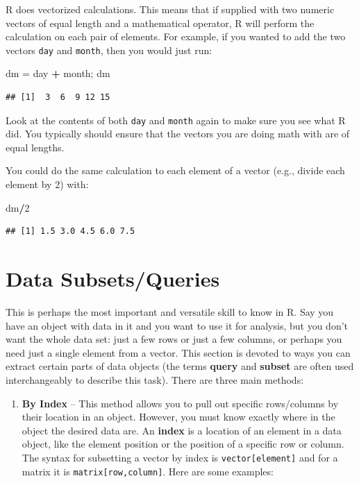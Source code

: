 \documentclass[]{book}
\newenvironment{Shaded}{\begin{snugshade}}{\end{snugshade}}
\newcommand{\DecValTok}[1]{\textcolor[rgb]{0.00,0.00,0.81}{#1}}
\newcommand{\StringTok}[1]{\textcolor[rgb]{0.31,0.60,0.02}{#1}}
\newcommand{\OperatorTok}[1]{\textcolor[rgb]{0.81,0.36,0.00}{\textbf{#1}}}
\newcommand{\NormalTok}[1]{#1}
\providecommand{\tightlist}{%
  \setlength{\itemsep}{0pt}\setlength{\parskip}{0pt}}
\theoremstyle{definition}
\theoremstyle{definition}
\theoremstyle{definition}
\theoremstyle{remark}
\begin{document}
R does vectorized calculations. This means that if supplied with two
numeric vectors of equal length and a mathematical operator, R will
perform the calculation on each pair of elements. For example, if you
wanted to add the two vectors \texttt{day} and \texttt{month}, then you
would just run:

\begin{Shaded}
\begin{Highlighting}[]
\NormalTok{dm =}\StringTok{ }\NormalTok{day }\OperatorTok{+}\StringTok{ }\NormalTok{month; dm}
\end{Highlighting}
\end{Shaded}

\begin{verbatim}
## [1]  3  6  9 12 15
\end{verbatim}

Look at the contents of both \texttt{day} and \texttt{month} again to
make sure you see what R did. You typically should ensure that the
vectors you are doing math with are of equal lengths.

You could do the same calculation to each element of a vector (e.g.,
divide each element by 2) with:

\begin{Shaded}
\begin{Highlighting}[]
\NormalTok{dm}\OperatorTok{/}\DecValTok{2}
\end{Highlighting}
\end{Shaded}

\begin{verbatim}
## [1] 1.5 3.0 4.5 6.0 7.5
\end{verbatim}

\section{Data Subsets/Queries}\label{sub}

This is perhaps the most important and versatile skill to know in R. Say
you have an object with data in it and you want to use it for analysis,
but you don't want the whole data set: just a few rows or just a few
columns, or perhaps you need just a single element from a vector. This
section is devoted to ways you can extract certain parts of data objects
(the terms \textbf{query} and \textbf{subset} are often used
interchangeably to describe this task). There are three main methods:

\begin{enumerate}
\def\labelenumi{\arabic{enumi}.}
\tightlist
\item
  \textbf{By Index} -- This method allows you to pull out specific
  rows/columns by their location in an object. However, you must know
  exactly where in the object the desired data are. An \textbf{index} is
  a location of an element in a data object, like the element position
  or the position of a specific row or column. The syntax for subsetting
  a vector by index is \texttt{vector{[}element{]}} and for a matrix it
  is \texttt{matrix{[}row,column{]}}. Here are some examples:
\end{enumerate}
\end{document}
